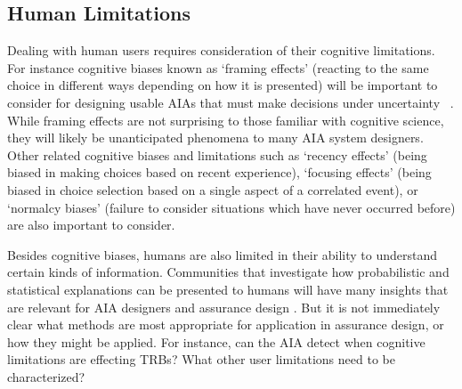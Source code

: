 \subsection{Human Limitations}
Dealing with human users requires consideration of their cognitive limitations. For instance cognitive biases known as `framing effects' (reacting to the same choice in different ways depending on how it is presented) will be important to consider for designing usable AIAs that must make decisions under uncertainty ~\cite{Freedy2007-sg,Riley1996-qm}. While framing effects are not surprising to those familiar with cognitive science, they will likely be unanticipated phenomena to many AIA system designers. Other related cognitive biases and limitations such as `recency effects' (being biased in making choices based on recent experience), `focusing effects' (being biased in choice selection based on a single aspect of a correlated event), or `normalcy biases' (failure to consider situations which have never occurred before) are also important to consider. 

Besides cognitive biases, humans are also limited in their ability to understand certain kinds of information. Communities that investigate how probabilistic and statistical explanations can be presented to humans will have many insights that are relevant for AIA designers and assurance design \cite{Rouse1986-dz,Wallace2001-fm,Kuhn1997-qc,Lomas2012-ie,Swartout1983-ko}. But it is not immediately clear what methods are most appropriate for application in assurance design, or how they might be applied. For instance, can the AIA detect when cognitive limitations are effecting TRBs? What other user limitations need to be characterized? %




